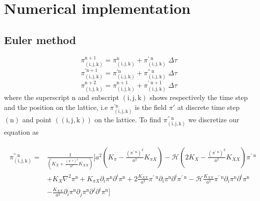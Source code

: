 \documentclass[a4paper,11pt]{article}
\def\be{\begin{equation}}
\def\ee{\end{equation}}
\newcommand{\lat}{{ (\mathrm i,\mathrm j,\mathrm k )}}
\newcommand {\mf}{\mathrm}
\begin{document}
\section{Numerical implementation}
\subsection{Euler method}

 \be
  \pi^{\mf n+1}_\lat=  \pi^{ \mf n } _\lat+  \pi^{' \; \mf n }_\lat \; \Delta \tau
 \ee
\be
  \pi^{' \mf n+1}_\lat=  \pi^{' \mf n } _\lat+  \pi^{'' \; \mf n}_\lat \; \Delta \tau
 \ee
 \be
  \pi^{\mf n+2}_\lat=  \pi^{ \mf n +1} _\lat+  \pi^{' \; \mf n +1}_\lat \; \Delta \tau
 \ee
where the superscript ${\mf n}$ and subscript $\lat$ shows respectively the time step and the position on the lattice, i.e $ \pi^{' \mf n}_\lat $ is the field $\pi'$ at discrete time step $(\mf n)$ and point $(\lat)$  on the lattice.  To find $\pi^{''  \; \mf n}_\lat$ {we discretize our equation as}
 
\begin{align}
\begin{split}
 \pi^{ '' \;\mf n}_\lat  =&   \frac{1}{\left(K_{X}+\frac{ (\pi^{\prime \; n})^ 2}{a^{2}} K_{X X}\right) }
 \Bigg[ a^{2}\left(K_{\pi}-\frac{(\pi^{\prime \; \mf n})^ 2}{a^{2}} K_{\pi X}\right)-\mathcal{H}\left(2 K_{X}-\frac{(\pi^{\prime \; \mf n})^ 2}{a^{2}} K_{X X}\right) \pi^{\prime \; \mf n} \\
&+K_{X} \nabla^{2} \pi^{\mf n}+K_{\pi X} \partial_{i} \pi^{\mf n} \partial^{i} \pi^{\mf n}+2 \frac{K_{X X}}{a^{2}} \pi^{\prime \; \mf n} \partial_{i} \pi^{\mf n} \partial^{i} \pi^{\prime \; \mf n}
-\mathcal{H} \frac{K_{X X}}{a^{2}} \pi^{\prime \; \mf n} \partial_{i} \pi^{\mf n} \partial^{i} \pi^{\mf n} \\
&-\frac{K_{X X}}{a^{2}} \partial_{i} \pi^{\mf n} \partial_{j} \pi^{\mf n} \partial^{j} \partial^{i} \pi^{\mf n}
 \Bigg]
\end{split}
\end{align}
\end{document}
